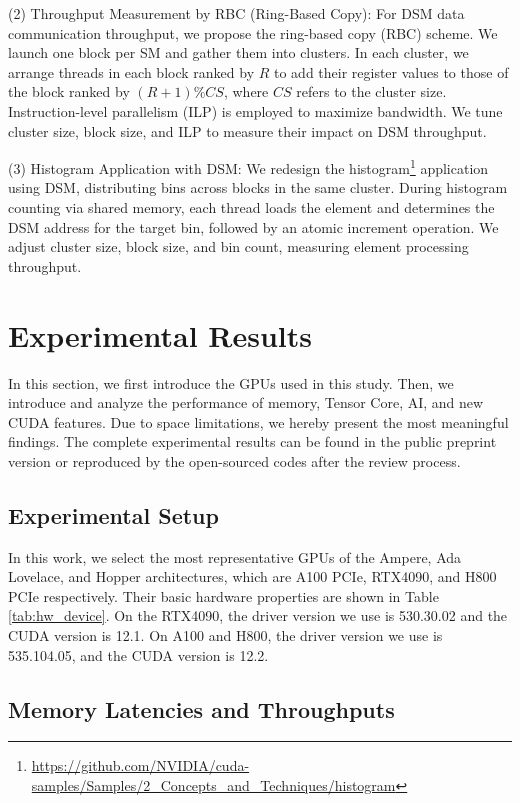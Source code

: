 (2) Throughput Measurement by RBC (Ring-Based Copy): For DSM data communication throughput, we propose the ring-based copy (RBC) scheme. We launch one block per SM and gather them into clusters. In each cluster, we arrange threads in each block ranked by $R$ to add their register values to those of the block ranked by $(R+1)\%CS$, where $CS$ refers to the cluster size. Instruction-level parallelism (ILP) is employed to maximize bandwidth. We tune cluster size, block size, and ILP to measure their impact on DSM throughput.

(3) Histogram Application with DSM: We redesign the histogram\footnote{\url{https://github.com/NVIDIA/cuda-samples/Samples/2_Concepts_and_Techniques/histogram}} application using DSM, distributing bins across blocks in the same cluster. During histogram counting via shared memory, each thread loads the element and determines the DSM address for the target bin, followed by an atomic increment operation. We adjust cluster size, block size, and bin count, measuring element processing throughput.

\section{Experimental Results} In this section, we first introduce the GPUs used in this study. Then, we introduce and analyze the performance of memory, Tensor Core, AI, and new CUDA features. Due to space limitations, we hereby present the most meaningful findings. The complete experimental results can be found in the public preprint version or reproduced by the open-sourced codes after the review process.
\subsection{Experimental Setup}

In this work, we select the most representative GPUs of the Ampere, Ada Lovelace, and Hopper architectures, which are A100 PCIe, RTX4090, and H800 PCIe respectively. Their basic hardware properties are shown in Table \ref{tab:hw_device}. On the RTX4090, the driver version we use is 530.30.02 and the CUDA version is 12.1. On A100 and H800, the driver version we use is 535.104.05, and the CUDA version is 12.2. 

\subsection{Memory Latencies and Throughputs}

